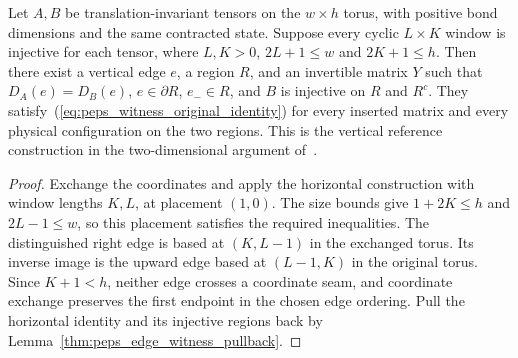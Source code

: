 \begin{lemma}%
    \label{thm:peps_vertical_arc_window_witness}
    \leanok
    Let $A,B$ be translation-invariant tensors on the $w\times h$
    torus, with positive bond dimensions and the same contracted state.
    Suppose every cyclic $L\times K$ window is injective for each tensor,
    where $L,K>0$, $2L+1\leq w$ and $2K+1\leq h$.
    Then there exist a vertical edge $e$, a region $R$, and an invertible
    matrix $Y$ such that $D_A(e)=D_B(e)$, $e\in\partial R$, $e_-\in R$,
    and $B$ is injective on $R$ and $R^c$.
    They satisfy~(\ref{eq:peps_witness_original_identity}) for every
    inserted matrix and every physical configuration on the two regions.
    This is the vertical reference construction in the two-dimensional
    argument of~\cite{Molnar2018NormalPEPS}.
\end{lemma}
\begin{proof}\leanok
    Exchange the coordinates and apply the horizontal construction
    with window lengths $K,L$, at placement $(1,0)$.
    The size bounds give $1+2K\leq h$ and $2L-1\leq w$,
    so this placement satisfies the required inequalities.
    The distinguished right edge is based at $(K,L-1)$ in the
    exchanged torus. Its inverse image is the upward edge based at
    $(L-1,K)$ in the original torus.
    Since $K+1<h$, neither edge crosses a coordinate seam, and
    coordinate exchange preserves the first endpoint in the chosen
    edge ordering. Pull the horizontal identity and its
    injective regions back by Lemma~\ref{thm:peps_edge_witness_pullback}.
\end{proof}
